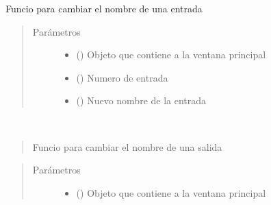 \documentclass[letterpaper,10pt,spanish]{sphinxmanual}
\begin{document}
\begin{fulllineitems}
\begin{fulllineitems}
\label{\detokenize{codigos/rutinas_fuzzy:rutinas_fuzzy.FuzzyController.cambiar_nombre_input}}
Funcio para cambiar el nombre de una entrada
\begin{quote}\begin{description}
\item[{Parámetros}] \leavevmode\begin{itemize}
\item {} 
 () \textendash{} Objeto que contiene a la ventana principal

\item {} 
 () \textendash{} Numero de entrada

\item {} 
 () \textendash{} Nuevo nombre de la entrada

\end{itemize}

\end{description}\end{quote}

\end{fulllineitems}


\begin{fulllineitems}
\label{\detokenize{codigos/rutinas_fuzzy:rutinas_fuzzy.FuzzyController.cambiar_nombre_output}}~\begin{quote}

Funcio para cambiar el nombre de una salida
\end{quote}
\begin{quote}\begin{description}
\item[{Parámetros}] \leavevmode\begin{itemize}
\item {} 
 () \textendash{} Objeto que contiene a la ventana principal


\end{itemize}
\end{description}
\end{quote}
\end{fulllineitems}
\end{fulllineitems}
\end{document}
